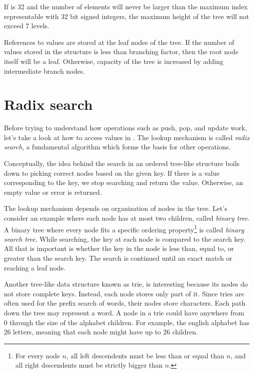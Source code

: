 If \m{} is 32 and the number of elements will never be larger than the maximum index representable with 32 bit signed integers, the maximum height of the tree will not exceed 7 levels. 

References to values are stored at the leaf nodes of the tree. If the number of values stored in the structure is less than branching factor, then the root node itself will be a leaf. Otherwise, capacity of the tree is increased by adding intermediate branch nodes. 

\section{Radix search}
\label{sec:rb-tree-radix-search}

Before trying to understand how operations such as push, pop, and update work, let's take a look at how to access values in \rbtree{}. The lookup mechanism is called \emph{radix search}, a fundamental algorithm which forms the basis for other operations.

Conceptually, the idea behind the search in an ordered tree-like structure boils down to picking correct nodes based on the given key. If there is a value corresponding to the key, we stop searching and return the value. Otherwise, an empty value or error is returned.

The lookup mechanism depends on organization of nodes in the tree. Let's consider an example where each node has at most two children, called \emph{binary tree}. A binary tree where every node fits a specific ordering property\footnote{For every node $n$, all left descendents must be less than or equal than $n$, and all right descendents must be strictly bigger than $n$.} is called \emph{binary search tree}. While searching, the key at each node is compared to the search key. All that is important is whether the key in the node is less than, equal to, or greater than the search key. The search is continued until an exact match or reaching a leaf node.

Another tree-like data structure known as trie, is interesting because its nodes do not store complete keys. Instead, each node stores only part of it. Since tries are often used for the prefix search of words, their nodes store characters. Each path down the tree may represent a word. A node in a trie could have anywhere from 0 through the size of the alphabet children. For example, the english alphabet has 26 letters, meaning that each node might have up to 26 children.

